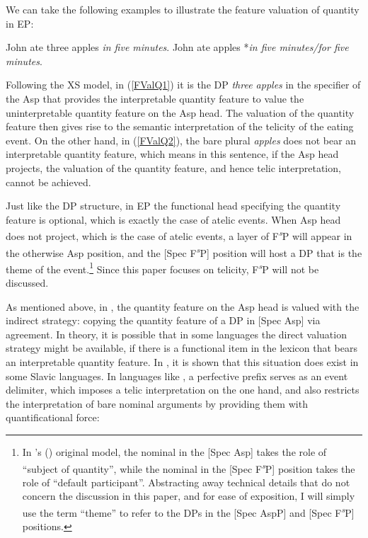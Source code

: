 \documentclass[output=paper]{langsci/langscibook}
\begin{document}
We can take the following examples to illustrate the feature valuation of
quantity in EP:

\begin{exe}
    \ex\label{FValQ1} John ate three apples \emph{in five minutes}.
    \ex\label{FValQ2} John ate apples *\emph{in five minutes/for five minutes}.
\end{exe}

Following the XS model, in (\ref{FValQ1}) it is the DP \emph{three apples} in
the specifier of the Asp that provides the interpretable quantity
feature to value the uninterpretable quantity feature on the Asp head.
The valuation of the quantity feature then gives rise to the semantic
interpretation of the telicity of the eating event. On the other hand, in
(\ref{FValQ2}), the bare plural \emph{apples} does not bear an interpretable
quantity feature, which means in this sentence, if the Asp head
projects, the valuation of the quantity feature, and hence telic
interpretation, cannot be achieved.

Just like the DP structure, in EP the functional head specifying the quantity
feature is optional, which is exactly the case of atelic events. When
Asp head does not project, which is the case of atelic events, a layer
of F\textsuperscript{\emph{s}}P will appear in the otherwise Asp position, and the [Spec F\textsuperscript{\emph{s}}P]
position will host a DP that is the theme of the event.\footnote{In
\citeauthor{Borer2005b}'s (\citeyear{Borer2005b}) original model, the
nominal in the [Spec Asp] takes the role of ``subject of quantity'',
while the nominal in the [Spec F\textsuperscript{\emph{s}}P] position takes the
role of ``default participant''. Abstracting away technical details that do not
concern the discussion in this paper, and for ease of exposition, I will simply
use the term ``theme'' to refer to the DPs in the [Spec AspP] and [Spec
F\textsuperscript{\emph{s}}P] positions.} Since this paper focuses on telicity,
F\textsuperscript{\emph{s}}P will not be discussed.

As mentioned above, in , the quantity feature on the Asp head is
valued with the indirect strategy: copying the quantity feature of a DP in
[Spec Asp] via agreement. In theory, it is possible that in some
languages the direct valuation strategy might be available, if there is a
functional item in the lexicon that bears an interpretable quantity feature. In
\textcite{Borer2005b}, it is shown that this situation does exist in some
Slavic languages. In languages like , a perfective prefix serves as an
event delimiter, which imposes a telic interpretation on the one hand, and also
restricts the interpretation of bare nominal arguments by providing them with
quantificational force:
\end{document}
